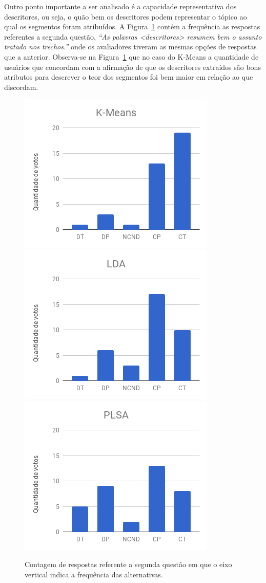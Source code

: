 Outro ponto importante a ser analisado é a capacidade representativa dos descritores, ou seja, o quão bem os descritores podem representar o tópico ao qual os segmentos foram atribuídos. A Figura~\ref{fig:Q2} contém a frequência as respostas referentes a segunda questão, \textit{``As palavras \textit{<descritores>} resumem bem o assunto tratado nos trechos.''} onde os avaliadores tiveram as mesmas opções de respostas que a anterior. Observa-se na Figura~\ref{fig:Q2} que no caso do K-Means a quantidade de usuários que concordam com a afirmação de que os descritores extraídos são bons atributos para descrever o teor dos segmentos foi bem maior em relação ao que discordam.

\begin{figure}[!h] \centering     %

		\includegraphics[width=.31\textwidth]{conteudo/capitulos/figs/figuras-experimento/Q2-KMeans.png}
		\includegraphics[width=.31\textwidth]{conteudo/capitulos/figs/figuras-experimento/Q2-LDA.png}
		\includegraphics[width=.31\textwidth]{conteudo/capitulos/figs/figuras-experimento/Q2-PLSA.png}
	\caption{Contagem de respostas referente a segunda questão em que o eixo vertical indica a frequência das alternativas.  }
	\label{fig:Q2}
\end{figure}


